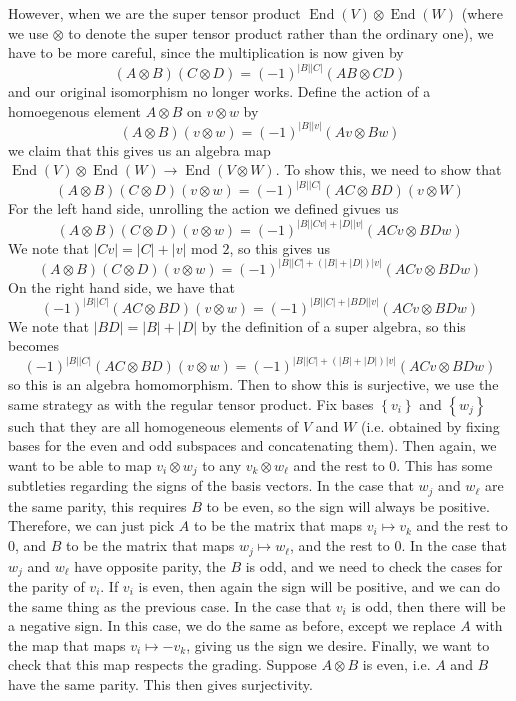 \documentclass[psamsfonts]{amsart}
\theoremstyle{definition}
\theoremstyle{remark}
\newcommand{\set}[1]{\left\lbrace #1 \right\rbrace}
\DeclareMathOperator{\End}{End}
\begin{document}
However, when we are the super tensor product $\End(V) \otimes \End(W)$ (where we use $\otimes$ to denote the super tensor product rather than the ordinary one), we have to be more careful, since the multiplication is now given by
$$(A \otimes B)(C \otimes D) = (-1)^{|B||C|}(AB \otimes CD) $$
and our original isomorphism no longer works. Define the action of a homoegenous element $A \otimes B$ on $v \otimes w$ by
$$(A \otimes B)(v \otimes w) = (-1)^{|B| |v|}(Av \otimes Bw) $$
we claim that this gives us an algebra map $\End(V) \otimes \End(W) \to \End(V \otimes W)$. To show this, we need to show that 
$$(A \otimes B)(C \otimes D)(v \otimes w) = (-1)^{|B||C|}(AC \otimes BD)(v \otimes W) $$
For the left hand side, unrolling the action we defined givues us
$$(A \otimes B)(C \otimes D)(v \otimes w) = (-1)^{|B||Cv| + |D||v|}(ACv \otimes BDw)$$
We note that $|Cv| = |C| + |v|$ mod $2$, so this gives us
$$ (A \otimes B)(C \otimes D)(v \otimes w) = (-1)^{|B||C| + (|B| + |D|)|v|}(ACv \otimes BDw)$$ 
On the right hand side, we have that 
$$(-1)^{|B||C|}(AC \otimes BD)(v \otimes w) =  (-1)^{|B||C| + |BD||v|}(ACv \otimes BDw)$$
We note that $|BD| = |B| + |D|$ by the definition of a super algebra, so this becomes
$$(-1)^{|B||C|}(AC \otimes BD)(v \otimes w) = (-1)^{|B||C| + (|B| + |D|)|v|}(ACv \otimes BDw)$$
so this is an algebra homomorphism. Then to show this is surjective, we use the same strategy as with the regular tensor product. Fix bases $\set{v_i}$ and $\set{w_j}$ such that they are all homogeneous elements of $V$ and $W$ (i.e. obtained by fixing bases for the even and odd subspaces and concatenating them). Then again, we want to be able to map $v_i \otimes w_j$ to any $v_k \otimes w_\ell$ and the rest to $0$. This has some subtleties regarding the signs of the basis vectors. In the case that $w_j$ and $w_\ell$ are the same parity, this requires $B$ to be even, so the sign will always be positive. Therefore, we can just pick $A$ to be the matrix that maps $v_i \mapsto v_k$ and the rest to $0$, and $B$ to be the matrix that maps $w_j \mapsto w_\ell$, and the rest to $0$. In the case that $w_j$ and $w_\ell$ have opposite parity, the $B$ is odd, and we need to check the cases for the parity of $v_i$. If $v_i$ is even, then again the sign will be positive, and we can do the same thing as the previous case. In the case that $v_i$ is odd, then there will be a negative sign. In this case, we do the same as before, except we replace $A$ with the map that maps $v_i \mapsto -v_k$, giving us the sign we desire. Finally, we want to check that this map respects the grading. Suppose $A \otimes B$ is even, i.e. $A$ and $B$ have the same parity. This then gives surjectivity.
%
\setcounter{section}{6}
%
\setcounter{thm}{0}
%
\end{document}
